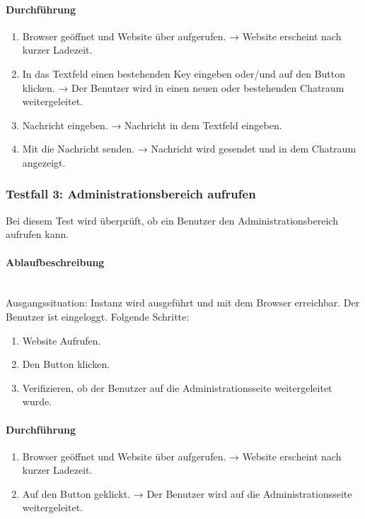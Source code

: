 \paragraph{Durchführung}
\begin{enumerate}
  \item Browser geöffnet und Website über  aufgerufen. \newline
  → Website erscheint nach kurzer Ladezeit.
  \item In das Textfeld  einen bestehenden Key eingeben oder/und auf den Button  klicken. \newline
  → Der Benutzer wird in einen neuen oder bestehenden Chatraum weitergeleitet.
  \item Nachricht eingeben. \newline
  → Nachricht in dem Textfeld  eingeben.
  \item Mit  die Nachricht senden. \newline
  → Nachricht wird gesendet und in dem Chatraum angezeigt.
\end{enumerate}

\subsubsection{Testfall 3: Administrationsbereich aufrufen}
Bei diesem Test wird überprüft, ob ein Benutzer den Administrationsbereich aufrufen kann.
\paragraph{Ablaufbeschreibung} \mbox{}\\
Ausgangssituation: Instanz wird ausgeführt und mit dem Browser erreichbar. Der Benutzer ist eingeloggt. Folgende Schritte: 
\begin{enumerate}
  \item Website Aufrufen.
  \item Den Button  klicken.
  \item Verifizieren, ob der Benutzer auf die Administrationsseite weitergeleitet wurde.
\end{enumerate}

\paragraph{Durchführung}
\begin{enumerate}
  \item Browser geöffnet und Website über  aufgerufen. \newline
  → Website erscheint nach kurzer Ladezeit.
  \item Auf den Button  geklickt. \newline
  → Der Benutzer wird auf die Administrationsseite weitergeleitet.
\end{enumerate}